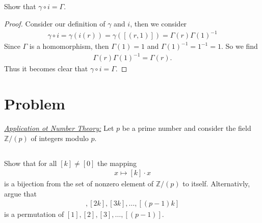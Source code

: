 \documentclass[10pt]{amsart}
\newcommand{\Z}{\mathbb{Z}}
\begin{document}
\subsection{}%
\label{sub:2c}

Show that $\gamma\circ i=\Gamma$.

\begin{proof}
  Consider our definition of $\gamma$ and $i$, then we consider
  \begin{align*}
    \gamma\circ i = \gamma(i(r))=\gamma([(r,1)])=\Gamma(r){\Gamma(1)}^{-1}
  \end{align*}
  Since $\Gamma$ is a homomorphism, then $\Gamma(1)=1$ and
  ${\Gamma(1)}^{-1}=1^{-1}=1$. So we find
  \begin{align*}
    \Gamma(r){\Gamma(1)}^{-1}=\Gamma(r).
  \end{align*}
  Thus it becomes clear that $\gamma\circ i=\Gamma$.
\end{proof}

\section{Problem}%
\label{sec:problem_3}

\underline{\textit{Application ot Number Theory:}} Let $p$ be a prime number
and consider the field $\Z/(p)$ of integers modulo $p$.

\subsection{}%
\label{sub:3a}

Show that for all $[k]\neq[0]$ the mapping
\begin{align*}
  x\mapsto[k]\cdot x
\end{align*}
is a bijection from the set of nonzero element of $\Z/(p)$ to itself.
Alternativly, argue that
\begin{align*}
  [k],[2k],[3k],\ldots,[(p-1)k]
\end{align*}
is a permutation of $[1],[2],[3],\ldots,[(p-1)]$.
\end{document}
